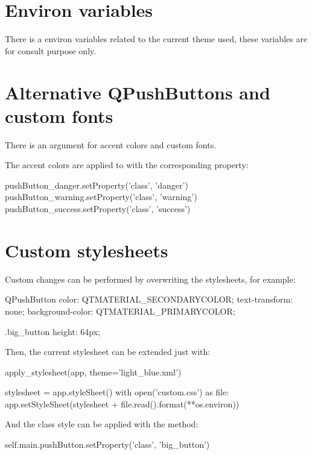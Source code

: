 \section{Environ variables}
There is a environ variables related to the current theme used, these variables are for consult purpose only.



\section{Alternative QPushButtons and custom fonts}
There is an  argument for accent colors and custom fonts.
The accent colors are applied to  with the corresponding  property:
\begin{python}
pushButton_danger.setProperty('class', 'danger')
pushButton_warning.setProperty('class', 'warning')
pushButton_success.setProperty('class', 'success')
\end{python}



\section{Custom stylesheets}
Custom changes can be performed by overwriting the stylesheets, for example:
\begin{python}
QPushButton {{
  color: {QTMATERIAL_SECONDARYCOLOR};
  text-transform: none;
  background-color: {QTMATERIAL_PRIMARYCOLOR};
}}

.big_button {{
  height: 64px;
}}
\end{python}
Then, the current stylesheet can be extended just with:
\begin{python}
apply_stylesheet(app, theme='light_blue.xml')

stylesheet = app.styleSheet()
with open('custom.css') as file:
    app.setStyleSheet(stylesheet + file.read().format(**os.environ))
\end{python}
And the class style can be applied with the  method:
\begin{python}
self.main.pushButton.setProperty('class', 'big_button')
\end{python}

